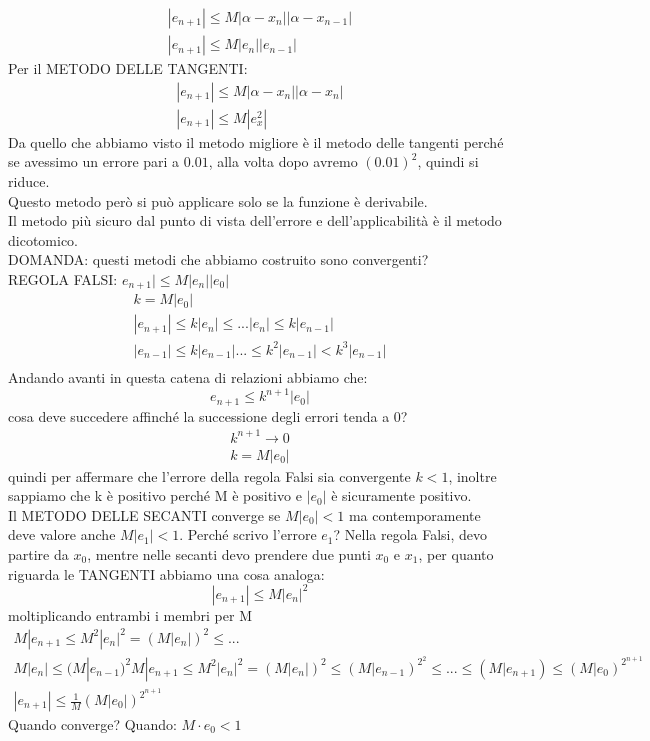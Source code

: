 \documentclass[a4paper, portrait]{book}
\numberwithin{equation}{chapter} %
\begin{document}
\begin{gather}
    |e_{n+1}| \leq M |\alpha - x_n||\alpha - x_{n-1}|\\
    |e_{n+1}| \leq M |e_n||e_{n-1}|
\end{gather}
Per il METODO DELLE TANGENTI:
\begin{gather}
    |e_{n+1}| \leq M |\alpha - x_n||\alpha - x_n|\\
    |e_{n+1}| \leq M |e_x^2|
\end{gather}
Da quello che abbiamo visto il metodo migliore è il metodo delle tangenti perché se avessimo un errore pari a $0.01$, alla volta dopo avremo $(0.01)^2$, quindi si riduce.\\
Questo metodo però si può applicare solo se la funzione è derivabile.\\
Il metodo più sicuro dal punto di vista dell'errore e dell'applicabilità è il metodo dicotomico.\\
DOMANDA: questi metodi che abbiamo costruito sono convergenti?\\
REGOLA FALSI: $e_{n+1}| \leq M|e_n||e_0|$ 
\begin{gather}
    k = M |e_0|\\
    |e_{n+1}| \leq k |e_n| \leq ...
    |e_n| \leq k |e_{n-1}|\\
    |e_{n-1}|\leq k |e_{n-1}|
    ...\leq k^2 |e_{n-1}| < k^3 |e_{n-1}|\\    
\end{gather}
Andando avanti in questa catena di relazioni abbiamo che:
\begin{equation}
    e_{n+1} \leq k^{n+1}|e_0|
\end{equation}
cosa deve succedere affinché la successione degli errori tenda a 0?
\begin{gather}
    k^{n+1} \rightarrow 0\\
    k = M |e_0|
\end{gather}
quindi per affermare che l'errore della regola Falsi sia convergente $k<1$, inoltre sappiamo che k è positivo perché M è positivo e $|e_0|$ è sicuramente positivo.\\
Il METODO DELLE SECANTI converge se $M|e_0| < 1$ ma contemporamente deve valore anche $M|e_1|<1$. Perché scrivo l'errore $e_1$? Nella regola Falsi, devo partire da $x_0$, mentre nelle secanti devo prendere due punti $x_0$ e $x_1$, per quanto riguarda le TANGENTI abbiamo una cosa analoga:
\begin{equation}
    |e_{n+1}| \leq M|e_n|^2
\end{equation}
moltiplicando entrambi i membri per M
\begin{gather}
    M|e_{n+1} \leq M^2 |e_n|^2 = (M|e_n|)^2 \leq ...\\
    M|e_n| \leq (M|e_{n-1})^2
    M|e_{n+1} \leq M^2 |e_n|^2 = (M|e_n|)^2 \leq (M|e_{n-1})^{2^2} \leq ... \leq \left(M|e_{n+1}\right)\leq \left(M|e_0\right)^{2^{n+1}}\\
    |e_{n+1}| \leq \frac{1}{M}\left(M|e_0|\right)^{2^{n+1}}
\end{gather}
Quando converge? Quando: $M\cdot e_0 < 1$
\end{document}
